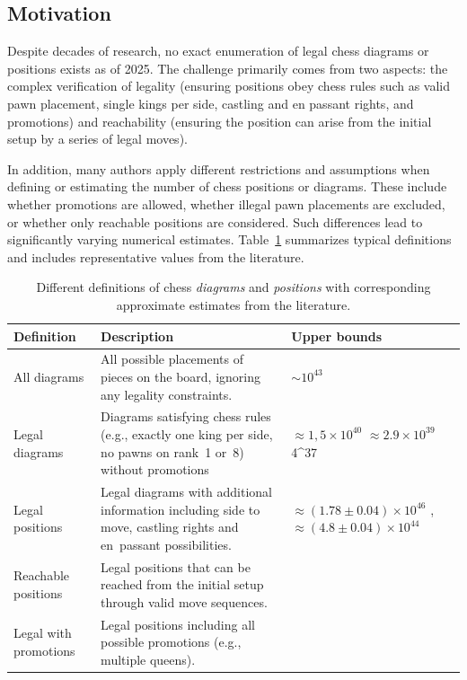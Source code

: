 \documentclass[12pt]{article}
\begin{document}
\subsection{Motivation}

Despite decades of research, no exact enumeration of legal chess diagrams or positions exists as of 2025. 
The challenge primarily comes from two aspects: the complex verification of legality 
(ensuring positions obey chess rules such as valid pawn placement, single kings per side, 
castling and en passant rights, and promotions) and reachability 
(ensuring the position can arise from the initial setup by a series of legal moves). 

In addition, many authors apply different restrictions and assumptions when defining or estimating 
the number of chess positions or diagrams. These include whether promotions are allowed, whether illegal pawn 
placements are excluded, or whether only reachable positions are considered. Such differences lead 
to significantly varying numerical estimates. Table~\ref{tab:definitions} summarizes typical definitions 
and includes representative values from the literature.

\begin{table}[h!]
\centering
\renewcommand{\arraystretch}{1.3}
\begin{tabular}{p{3.8cm} p{6.2cm} p{4.9cm}}
\toprule
\textbf{Definition} & \textbf{Description} & \textbf{Upper bounds} \\
\midrule
All diagrams & All possible placements of pieces on the board, ignoring any legality constraints. 
& $\sim 10^{43}$ \cite{shannon1950} \\[0.3em]

Legal diagrams & Diagrams satisfying chess rules (e.g., exactly one king per side, no pawns on rank~1 or~8) without promotions 
& $\approx 1,5\times10^{40}$ \cite{steinerberger2015} $\approx 2.9\times10^{39}$ \cite{tromp2021b} 4\times 10^{37} \cite{gourion2021} \\[0.3em]

Legal positions & Legal diagrams with additional information including side to move, castling rights and en~passant possibilities. 
& $\approx (1.78\pm0.04)\times10^{46}$ \cite{chinchalkar1996} , $\approx (4.8\pm0.04)\times10^{44}$ \cite{tromp2021b} \\[0.3em]

Reachable positions & Legal positions that can be reached from the initial setup through valid move sequences. 
&  \\[0.3em]

Legal with promotions & Legal positions including all possible promotions (e.g., multiple queens). 
& \\
\bottomrule
\end{tabular}
\caption{Different definitions of chess \textit{diagrams} and \textit{positions} with corresponding approximate estimates from the literature.}
\label{tab:definitions}
\end{table}
\end{document}
